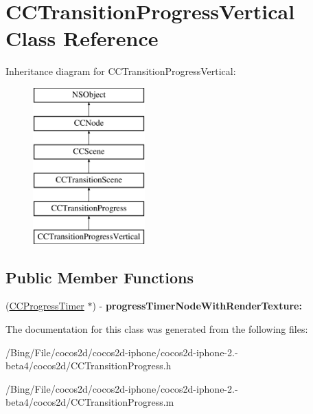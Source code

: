 \hypertarget{interface_c_c_transition_progress_vertical}{\section{C\-C\-Transition\-Progress\-Vertical Class Reference}
\label{interface_c_c_transition_progress_vertical}
}
Inheritance diagram for C\-C\-Transition\-Progress\-Vertical\-:\begin{figure}[H]
\begin{center}
\leavevmode
\includegraphics[height=6.000000cm]{interface_c_c_transition_progress_vertical}
\end{center}
\end{figure}
\subsection*{Public Member Functions}
\begin{DoxyCompactItemize}
\item 
\hypertarget{interface_c_c_transition_progress_vertical_a9d89e0f68c41b6dc7810df2b3d3f4ffe}{(\hyperlink{interface_c_c_progress_timer}{C\-C\-Progress\-Timer} $\ast$) -\/ {\bfseries progress\-Timer\-Node\-With\-Render\-Texture\-:}}\label{interface_c_c_transition_progress_vertical_a9d89e0f68c41b6dc7810df2b3d3f4ffe}

\end{DoxyCompactItemize}


The documentation for this class was generated from the following files\-:\begin{DoxyCompactItemize}
\item 
/\-Bing/\-File/cocos2d/cocos2d-\/iphone/cocos2d-\/iphone-\/2.-\/beta4/cocos2d/C\-C\-Transition\-Progress.\-h\item 
/\-Bing/\-File/cocos2d/cocos2d-\/iphone/cocos2d-\/iphone-\/2.-\/beta4/cocos2d/C\-C\-Transition\-Progress.\-m\end{DoxyCompactItemize}
